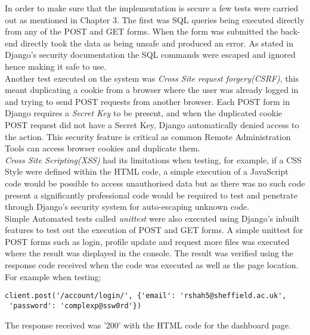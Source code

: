 \documentclass[../main.tex]{subfiles}
\begin{document}
\raggedright
In order to make sure that the implementation is secure a few tests were carried out as mentioned in Chapter 3. The first was SQL queries being executed directly from any of the POST and GET forms. When the form was submitted the back-end directly took the data as being unsafe and produced an error. As stated in Django's security documentation\cite{djangoSecurity} the SQL commands were escaped and ignored hence making it safe to use. \\[4mm]

Another test executed on the system was \textit{Cross Site request forgery(CSRF)}, this meant duplicating a cookie from a browser where the user was already logged in and trying to send POST requests from another browser. Each POST form in Django requires a \textit{Secret Key} to be present, and when the duplicated cookie POST request did not have a Secret Key, Django automatically denied access to the action. This security feature is critical as common Remote Administration Tools can access browser cookies and duplicate them. \\[4mm]

\textit{Cross Site Scripting(XSS)} had its limitations when testing, for example, if a CSS Style were defined within the HTML code, a simple execution of a JavaScript code would be possible to access unauthorised data but as there was no such code present a significantly professional code would be required to test and penetrate through Django's security system for auto-escaping unknown code. \\[4mm]

Simple Automated tests called \textit{unittest} were also executed using Django's inbuilt features to test out the execution of POST and GET forms. A simple unittest for POST forms such as login, profile update and request more files was executed where the result was displayed in the console. The result was verified using the response code received when the code was executed as well as the page location. For example when testing; \\
\begin{verbatim}
client.post('/account/login/', {'email': 'rshah5@sheffield.ac.uk',
 'password': 'complexp@ssw0rd'}) 
\end{verbatim}
The response received was '200' with the HTML code for the dashboard page. \\[4mm]
\end{document}
